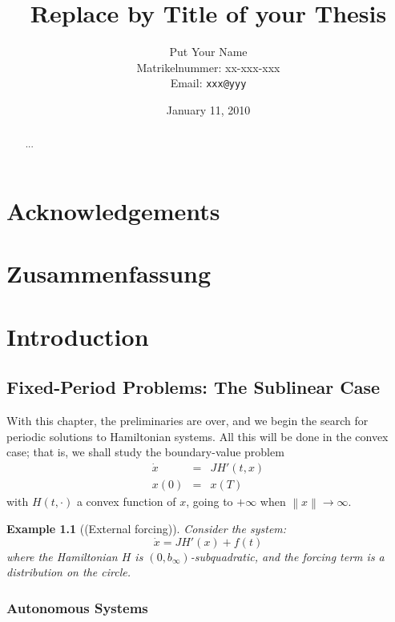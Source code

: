 \documentclass[abstracton,12pt]{scrreprt}
\title{Replace by Title of your Thesis}
\author{
  Put Your Name\\[-5pt]
  \scriptsize Matrikelnummer: xx-xxx-xxx\\[-5pt]
  \scriptsize Email: \texttt{xxx@yyy}
}
\date{\vspace*{2cm}January 11, 2010}
\newtheorem{example}{Example}
\begin{document}
\maketitle

\chapter*{Acknowledgements}

\begin{abstract}
  ...
\end{abstract}

\chapter*{Zusammenfassung}

\tableofcontents
\listoffigures
\listoftables

\chapter{Introduction}

\section{Fixed-Period Problems: The Sublinear Case}

With this chapter, the preliminaries are over, and we begin the search
for periodic solutions to Hamiltonian systems. All this will be done
in the convex case; that is, we shall study the boundary-value problem
\begin{eqnarray*}
  \dot{x}&=&JH' (t,x)\\
  x(0) &=& x(T)
\end{eqnarray*}
with $H(t,\cdot)$ a convex function of $x$, going to $+\infty$ when
$\left\|x\right\| \to \infty$.

\begin{example} [{\rm(External forcing)}]
Consider the system:
\begin{equation}
  \dot{x} = JH' (x) + f(t)
\end{equation}
where the Hamiltonian $H$ is $\left(0,b_{\infty}\right)$-subquadratic,
and the forcing term is a distribution on the circle.
\end{example}

\subsection{Autonomous Systems}
\end{document}
